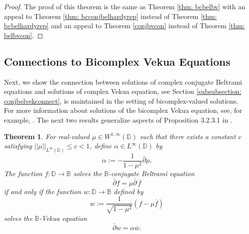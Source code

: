 \documentclass[12pt,reqno]{amsart}
\newtheorem{theorem}{Theorem}[section]
\theoremstyle{definition}
\theoremstyle{remark}
\newcommand{\dbar}{\bar\partial}
\newcommand{\bc}{\mathbb{B}}
\newcommand{\disk}{\mathbb{D}}
\begin{document}
    \begin{proof}

    The proof of this theorem is the same as Theorem \ref{thm: bcbelbv} with an appeal to Theorem \ref{thm: bcconjbelhardyrep} instead of Theorem \ref{thm: bcbelhardyrep} and an appeal to Theorem \ref{conjbvcon} instead of Theorem \ref{thm: belbvcon}.
    
    \end{proof}
    
    
    








\subsection{Connections to Bicomplex Vekua Equations} 

Next, we show the connection between solutions of complex conjugate Beltrami equations and solutions of complex Vekua equation, see Section \ref{subsubsection: conjbelvekconnect}, is maintained in the setting of bicomplex-valued solutions. For more information about solutions of the bicomplex Vekua equation, see, for example,  \cite{BCHoiv, BCTransmutation, BCBergman, BCHarmVek, CastaKrav, FundBicomplex, ComplexSchr}. The next two results generalize aspects of Proposition 3.2.3.1 in \cite{conjbel}. 


\begin{theorem}\label{thm: bcconjbelimpliesbcvek}
For real-valued $\mu\in W^{1,\infty}(\disk)$ such that there exists a constant $c$ satisfying $||\mu||_{L^\infty(\disk)}\leq c < 1$, define $\alpha \in L^\infty(\disk)$ by
\[
    \alpha := - \frac{1}{1-\mu^2} \dbar \mu.
\]
The function $f: \disk\to\bc$ solves the $\bc$-conjugate Beltrami equation
\[
        \dbar f = \mu\dbar \,\overline{f}
\]
if and only if the function $w: \disk\to\bc$ defined by 
\[
        w:= \frac{1}{\sqrt{1-\mu^2}} (f-\mu\overline{f})
\]
solves the $\bc$-Vekua equation
\[
        \dbar w = \alpha \overline{w}.
\]
\end{theorem}
\end{document}
